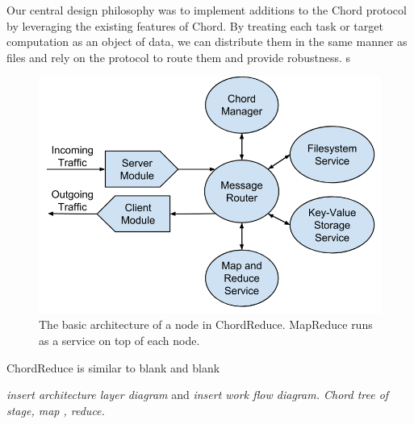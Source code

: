 \documentclass[10pt, conference, compsocconf]{IEEEtran}
\begin{document}
Our central design philosophy was to implement additions to the Chord protocol by leveraging the existing features of Chord.  By treating each task or target computation as an object of data, we can distribute them in the same manner as files and rely on the protocol to route them and provide robustness.
s

\begin{figure}
    \includegraphics[width=\linewidth]{crArch}
    \caption{The basic architecture of a node in ChordReduce.  MapReduce runs as a service on top of each node.}
    \label{crArch}
\end{figure}


ChordReduce  is similar to blank and blank


\textit{insert architecture layer diagram }  and \textit{insert work flow diagram.  Chord tree of stage, map , reduce.}
\end{document}
